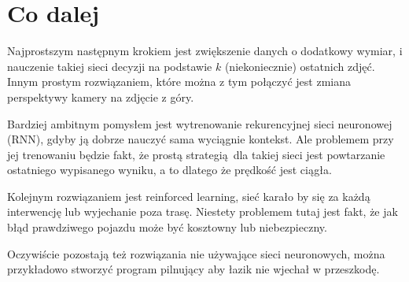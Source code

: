 \chapter{Co dalej}
Najprostszym następnym krokiem jest zwiększenie danych o dodatkowy wymiar, i nauczenie takiej
sieci decyzji na podstawie $k$ (niekoniecznie) ostatnich zdjęć. Innym prostym rozwiązaniem,
które można z tym połączyć jest zmiana perspektywy kamery na zdjęcie z góry.

Bardziej ambitnym pomysłem jest wytrenowanie rekurencyjnej sieci neuronowej (RNN),
gdyby ją dobrze nauczyć sama wyciągnie kontekst. Ale problemem przy jej trenowaniu
będzie fakt, że prostą strategią dla takiej sieci jest powtarzanie ostatniego wypisanego
wyniku, a to dlatego że prędkość jest ciągła.

Kolejnym rozwiązaniem jest reinforced learning, sieć karało by się za
każdą interwencję lub wyjechanie poza trasę. Niestety problemem tutaj jest 
fakt, że jak błąd prawdziwego pojazdu może być kosztowny lub niebezpieczny.

Oczywiście pozostają też rozwiązania nie używające sieci neuronowych, można
przykładowo stworzyć program pilnujący aby łazik nie wjechał w przeszkodę.


